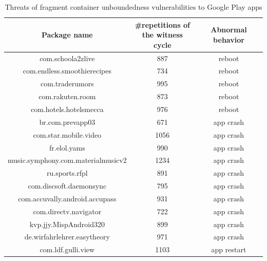 \begin{table}[htbp]
\begin{center}
	\begin{tabular}{|c|c|c|}   
		\hline   
		\textbf{Package name} & \shortstack{\#repetitions of \\ the witness cycle} & \textbf{Abnormal behavior} \\   
		\hline
			\hline    com.schoola2zlive & 887 & reboot  \\ 
			\hline    com.endless.smoothierecipes & 734 & reboot  \\ 
			\hline    com.traderumors & 995 & reboot  \\ 
			\hline    com.rakuten.room & 873 & reboot  \\ 
			\hline    com.hotels.hotelsmecca & 976 & reboot  \\ 
			\hline    br.com.prevapp03 & 671 & app crash  \\ 
			\hline    com.star.mobile.video & 1056 & app crash  \\ 
			\hline    fr.elol.yams & 990 & app crash  \\ 
			\hline   music.symphony.com.materialmusicv2 & 1234 & app crash  \\ 
			\hline    ru.sports.rfpl & 891 & app crash  \\ 
			\hline   com.discsoft.daemonsync & 795 & app crash  \\ 
			\hline  com.accuvally.android.accupass & 931 & app crash  \\ 
			\hline    com.directv.navigator & 722 & app crash  \\ 
			\hline    kvp.jjy.MispAndroid320 & 899& app crash  \\ 
			\hline  de.wirfahrlehrer.easytheory & 971& app crash  \\ 
			\hline   com.ldf.gulli.view & 1103 & app restart  \\ 
			\hline   
		\end{tabular}   
\caption{Threats of fragment container unboundedness vulnerabilities to Google Play apps} 
\label{tab:threat-gg-f}
	\end{center}   
\end{table}




